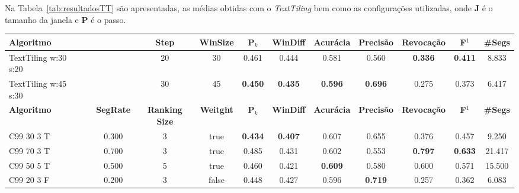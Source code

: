 \documentclass{article}
\begin{document}
 

Na Tabela~\ref{tab:resultadosTT} são apresentadas, as médias obtidas com o \textit{TextTiling} bem como as configurações utilizadas, onde \textbf{J} é o tamanho da janela e \textbf{P} é o passo.



\begin{table}[!h]
	\centering
	\begin{tabular}{|l||c|c|c|c|c|c|c|c|c|c|c|} \hline

		\textbf{Algoritmo} &&& 
		\textbf{Step} &
		\textbf{WinSize} & 
		\textbf{P$_k$} & 
		\textbf{WinDiff} & 
		\textbf{Acurácia} & 
		\textbf{Precisão} & 
		\textbf{Revocação} &
		\textbf{F$^1$} &
		\textbf{\#Segs} \\	\hline

TextTiling w:30 s:20 &&& 20 & 30 & 0.461 & 0.444 & 0.581 & 0.560 & \cellcolor{gray!20} \textbf{0.336} & \cellcolor{gray!20} \textbf{0.411} & 8.833  \\ \hline 

 TextTiling w:45 s:30 &&& 30 & 45 & \cellcolor{gray!20} \textbf{0.450} & \cellcolor{gray!20} \textbf{0.435} & \cellcolor{gray!20} \textbf{0.596} & \cellcolor{gray!20} \textbf{0.696} & 0.275 & 0.373 & 6.417  \\ \hline 

\hline
		\textbf{Algoritmo} &&
		\textbf{SegRate}& 
		\textbf{Ranking Size} &
		\textbf{Weitght} & 
		\textbf{P$_k$} & 
		\textbf{WinDiff} & 
		\textbf{Acurácia} & 
		\textbf{Precisão} & 
		\textbf{Revocação} &
		\textbf{F$^1$} &
		\textbf{\#Segs} \\	\hline

 C99 30  3 T && 0.300 & 3 & true & \cellcolor{gray!20} \textbf{0.434} & \cellcolor{gray!20} \textbf{0.407} & 0.607 & 0.655 & 0.376 & 0.457 & 9.250  \\ \hline 

 C99 70  3 T && 0.700 & 3 & true & 0.485 & 0.431 & 0.602 & 0.553 & \cellcolor{gray!20} \textbf{0.797} & \cellcolor{gray!20} \textbf{0.633} & 21.417  \\ \hline 

 C99 50  5 T && 0.500 & 5 & true & 0.460 & 0.421 & \cellcolor{gray!20} \textbf{0.609} & 0.580 & 0.600 & 0.571 & 15.500  \\ \hline 

 C99 20  3 F && 0.200 & 3 & false & 0.448 & 0.427 & 0.596 & \cellcolor{gray!20} \textbf{0.719} & 0.257 & 0.362 & 6.083  \\ \hline 



\end{tabular}
\end{table}
\end{document}
